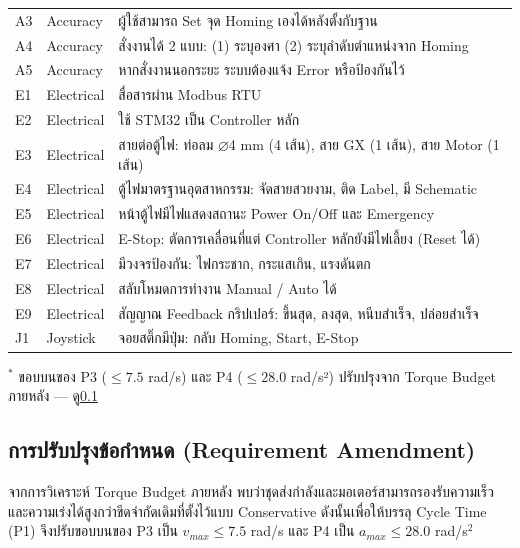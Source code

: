 \begin{table}[H]
\begin{tabular}{p{1.5cm} p{2.2cm} p{9.8cm}}
    A3  & Accuracy & ผู้ใช้สามารถ Set จุด Homing เองได้หลังตั้งกับฐาน \\
    A4  & Accuracy & สั่งงานได้ 2 แบบ: (1) ระบุองศา (2) ระบุลำดับตำแหน่งจาก Homing \\
    A5  & Accuracy & หากสั่งงานนอกระยะ ระบบต้องแจ้ง Error หรือป้องกันไว้ \\
    \midrule
    E1  & Electrical & สื่อสารผ่าน Modbus RTU \\
    E2  & Electrical & ใช้ STM32 เป็น Controller หลัก \\
    E3  & Electrical & สายต่อตู้ไฟ: ท่อลม $\varnothing$4 mm (4 เส้น), สาย GX (1 เส้น), สาย Motor (1 เส้น) \\
    E4  & Electrical & ตู้ไฟมาตรฐานอุตสาหกรรม: จัดสายสวยงาม, ติด Label, มี Schematic \\
    E5  & Electrical & หน้าตู้ไฟมีไฟแสดงสถานะ Power On/Off และ Emergency \\
    E6  & Electrical & E-Stop: ตัดการเคลื่อนที่แต่ Controller หลักยังมีไฟเลี้ยง (Reset ได้) \\
    E7  & Electrical & มีวงจรป้องกัน: ไฟกระชาก, กระแสเกิน, แรงดันตก \\
    E8  & Electrical & สลับโหมดการทำงาน Manual / Auto ได้ \\
    E9  & Electrical & สัญญาณ Feedback กริปเปอร์: ขึ้นสุด, ลงสุด, หนีบสำเร็จ, ปล่อยสำเร็จ \\
    \midrule
    J1  & Joystick & จอยสติ๊กมีปุ่ม: กลับ Homing, Start, E-Stop \\
    \bottomrule
  \end{tabular}
\end{table}

\noindent\small{$^*$ ขอบบนของ P3 ($\leq 7.5$ rad/s) และ P4 ($\leq 28.0$ rad/s²)
ปรับปรุงจาก Torque Budget ภายหลัง — ดู\cref{subsec:req_amendment}}

\subsection{การปรับปรุงข้อกำหนด (Requirement Amendment)}
\label{subsec:req_amendment}

จากการวิเคราะห์ Torque Budget ภายหลัง พบว่าชุดส่งกำลังและมอเตอร์สามารถรองรับความเร็วและความเร่งได้สูงกว่าขีดจำกัดเดิมที่ตั้งไว้แบบ Conservative
ดังนั้นเพื่อให้บรรลุ Cycle Time (P1) จึงปรับขอบบนของ P3 เป็น $v_{max} \le 7.5$ rad/s
และ P4 เป็น $a_{max} \le 28.0$ rad/s$^2$

